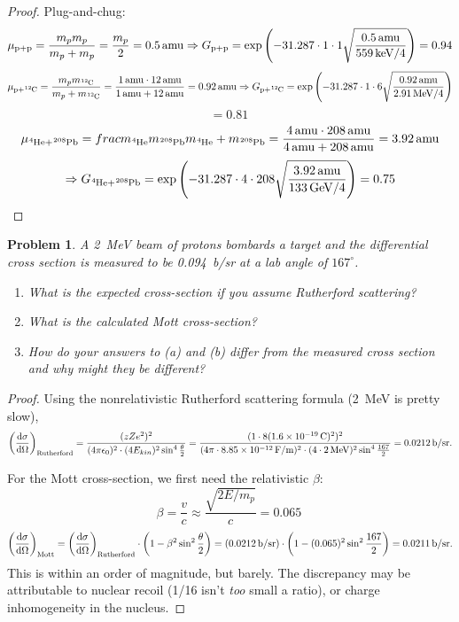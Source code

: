 \documentclass{article}
\newtheorem{plm}{Problem}
\begin{document}
\begin{proof}
  Plug-and-chug:
  \[
    \mu_{\ce{p + p}} = \frac{m_{p}m_{p}}{m_{p} + m_{p}} = \frac{m_{p}}{2} = \SI{0.5}{amu}
    \Rightarrow G_{\ce{p + p}} = \exp\qty(-31.287 \cdot 1 \cdot 1 \sqrt{\frac{\SI{0.5}{amu}}{\SI{559}{keV} / 4}})
    = \SI{0.94}{}
  \]
  \[
    \mu_{\ce{p + ^{12}C}} = \frac{m_{p}m_{\ce{^{12}C}}}{m_{p} + m_{\ce{^{12}C}}} = \frac{\SI{1}{amu}\cdot\SI{12}{amu}}{\SI{1}{amu}+\SI{12}{amu}}
    = \SI{0.92}{amu}
    \Rightarrow G_{\ce{p + ^{12}C}} = \exp\qty(-31.287 \cdot 1 \cdot 6 \sqrt{\frac{\SI{0.92}{amu}}{\SI{2.91}{MeV} / 4}})
  \]
  \[
    = \SI{0.81}{}
  \]
  \[
    \mu_{\ce{^{4}He + ^{208}Pb}} = frac{m_{\ce{^{4}He}}m_{\ce{^{208}{Pb}}}}{m_{\ce{^{4}He}} + m_{\ce{^{208}{Pb}}}}
    = \frac{\SI{4}{amu} \cdot \SI{208}{amu}}{\SI{4}{amu} + \SI{208}{amu}} = \SI{3.92}{amu}
  \]
  \[
    \Rightarrow G_{\ce{^{4}He + ^{208}Pb}} = \exp\qty(-31.287 \cdot 4 \cdot 208 \sqrt{\frac{\SI{3.92}{amu}}{\SI{133}{GeV} / 4}})
    = \SI{0.75}{}
  \]
\end{proof}

\begin{plm}
  A \SI{2}{MeV} beam of protons bombards a  target and the differential cross section is measured to be \SI{0.094}{b/sr}
  at a lab angle of $167^{\circ}$.
  \begin{enumerate}
  \item What is the expected cross-section if you assume Rutherford scattering?
  \item What is the calculated Mott cross-section?
  \item How do your answers to (a) and (b) differ from the measured cross section and why might they be different?
  \end{enumerate}
\end{plm}

\begin{proof}
  Using the nonrelativistic Rutherford scattering formula (\SI{2}{MeV} is pretty slow),
  \[
    \qty(\dv{\sigma}{\Omega})_{\text{Rutherford}} = \frac{(zZe^{2})^{2}}{(4\pi\epsilon_{0})^{2} \cdot (4E_{kin})^{2} \sin^{4}\frac{\theta}{2}}
    = \frac{(1 \cdot 8 (\SI{1.6e-19}{C})^{2})^{2}}{(4\pi \cdot \SI{8.85e-12}{F/m})^{2} \cdot (4 \cdot \SI{2}{MeV})^{2}\sin^{4}\frac{167}{2}}
    = \SI{0.0212}{b/sr}.
  \]

  For the Mott cross-section, we first need the relativistic $\beta$:
  \[
    \beta = \frac{v}{c} \approx \frac{\sqrt{2E/m_{p}}}{c} = \SI{0.065}{}
  \]
  \[
    \qty(\dv{\sigma}{\Omega})_{\text{Mott}} = \qty(\dv{\sigma}{\Omega})_{\text{Rutherford}} \cdot \qty(1 - \beta^{2}\sin^{2}\frac{\theta}{2})
    = (\SI{0.0212}{b/sr}) \cdot \qty(1 - (\SI{0.065}{})^{2}\sin^{2}\frac{167}{2}) = \SI{0.0211}{b/sr}.
  \]
  This is within an order of magnitude, but barely.
  The discrepancy may be attributable to nuclear recoil (1/16 isn't \textit{too} small a ratio), or charge inhomogeneity in the nucleus.
\end{proof}
\end{document}
